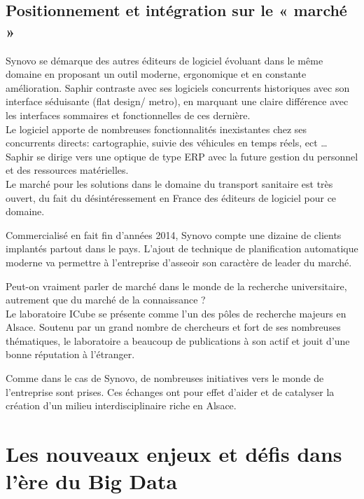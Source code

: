 \documentclass[french, 11pt]{memoir}
\begin{document}
\subsection{Positionnement et intégration sur le « marché
	»}\label{positionnement-et-intuxe9gration-sur-le-marchuxe9}

Synovo se démarque des autres éditeurs de logiciel évoluant dans le même
domaine en proposant un outil moderne, ergonomique et en constante
amélioration. Saphir contraste avec ses logiciels concurrents
historiques avec son interface séduisante (flat design/ metro), en
marquant une claire différence avec les interfaces sommaires et
fonctionnelles de ces dernière. \\
Le logiciel apporte de nombreuses fonctionnalités inexistantes chez ses
concurrents directs: cartographie, suivie des véhicules en temps réels,
ect \ldots{} Saphir se dirige vers une optique de type ERP avec la
future gestion du personnel et des ressources matérielles.\\
Le marché pour les solutions dans le domaine du transport sanitaire est
très ouvert, du fait du désintéressement en France des éditeurs de
logiciel pour ce domaine.

\bigskip
Commercialisé en fait fin d'années 2014, Synovo compte une dizaine de
clients implantés partout dans le pays. L'ajout de technique de planification automatique moderne va permettre à
l'entreprise d'asseoir son caractère de leader du marché.

\bigskip
Peut-on vraiment parler de marché dans le monde de la recherche
universitaire, autrement que du marché de la connaissance ?\\
Le laboratoire ICube se présente comme l'un des pôles de recherche
majeurs en Alsace. Soutenu par un grand nombre de chercheurs et fort de
ses nombreuses thématiques, le laboratoire a beaucoup de publications à
son actif et jouit d'une bonne réputation à l'étranger.

\bigskip
Comme dans le cas de Synovo, de nombreuses initiatives vers le monde de
l'entreprise sont prises. Ces échanges ont pour effet d'aider et de
catalyser la création d'un milieu interdisciplinaire riche en Alsace.

\section{Les nouveaux enjeux et défis dans l'ère du Big
	Data}\label{les-nouveaux-enjeux-et-duxe9fis-dans-luxe8re-du-big-data}
\end{document}
